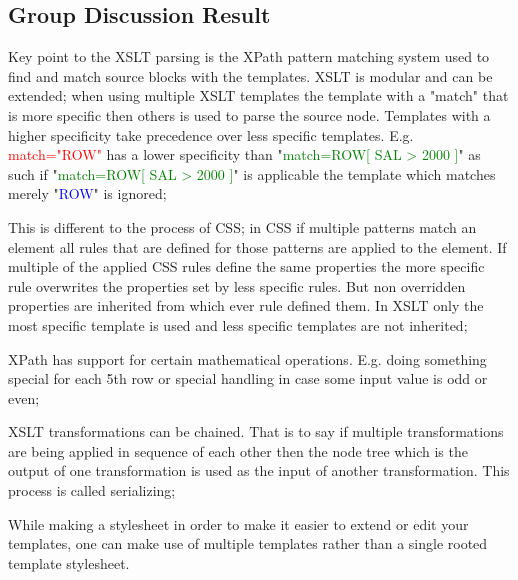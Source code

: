 \subsection{Group Discussion Result}
	Key point to the XSLT parsing is the XPath pattern matching system used to find and match source blocks with the templates. XSLT is modular and can be extended; when using multiple XSLT templates the template with a "match" that is more specific then others is used to parse the source node. Templates with a higher specificity take precedence over less specific templates. E.g. \textcolor{red}{match="ROW"} has a lower specificity than "\textcolor{green}{match=ROW[ SAL > 2000 ]}" as such if "\textcolor{green}{match=ROW[ SAL > 2000 ]}" is applicable the template which matches merely "\textcolor{blue}{ROW}" is ignored;

	This is different to the process of CSS; in CSS if multiple patterns match an element all rules that are defined for those patterns are applied to the element. If multiple of the applied CSS rules define the same properties the more specific rule overwrites the properties set by less specific rules. But non overridden properties are inherited from which ever rule defined them. In XSLT only the most specific template is used and less specific templates are not inherited;
	
	XPath has support for certain mathematical operations. E.g. doing something special for each 5th row or special handling in case some input value is odd or even;
	
	XSLT transformations can be chained. That is to say if multiple transformations are being applied in sequence of each other then the node tree which is the output of one transformation is used as the input of another transformation. This process is called serializing;
	
	While making a stylesheet in order to make it easier to extend or edit your templates, one can make use of multiple templates rather than a single rooted template stylesheet.

%

